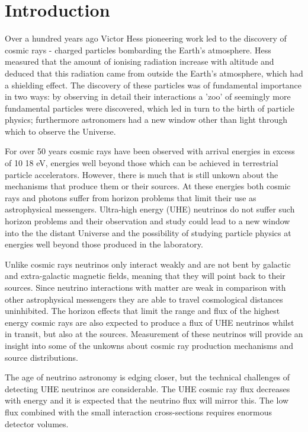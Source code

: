 \chapter{Introduction}
\label{chap:introduction}

Over a hundred years ago Victor Hess pioneering work led to the discovery of cosmic rays - charged particles bombarding the Earth's atmosphere. Hess measured that the amount of ionising radiation increase with altitude and deduced that this radiation came from outside the Earth's atmosphere, which had a shielding effect. The discovery of these particles was of fundamental importance in two ways: by observing in detail their interactions a 'zoo' of seemingly more fundamental particles were discovered, which led in turn to the birth of particle physics; furthermore astronomers had a new window other than light through which to observe the Universe.

For over 50 years cosmic rays have been observed with arrival energies in excess of 10 18 eV, energies well beyond those which can be achieved in terrestrial particle accelerators. However, there is much that is still unkown about the mechanisms that produce them or their sources. At these energies both cosmic rays and photons suffer from horizon problems that limit their use as astrophysical messengers. Ultra-high energy (UHE) neutrinos do not suffer such horizon problems and their observation and study could lead to a new window into the the distant Universe and the possibility of studying particle physics at energies well beyond those produced in the laboratory. 

Unlike cosmic rays neutrinos only interact weakly and are not bent by galactic and extra-galactic magnetic fields, meaning that they will point back to their sources. Since neutrino interactions with matter are weak in comparison with other astrophysical messengers they are able to travel cosmological distances uninhibited. The horizon effects that limit the range and flux of the highest energy cosmic rays are also expected to produce a flux of UHE neutrinos whilst in transit, but also at the sources. Measurement of these neutrinos will provide an insight into some of the unkowns about cosmic ray production mechanisms and source distributions.

The age of neutrino astronomy is edging closer, but the technical challenges of detecting UHE neutrinos are considerable. The UHE cosmic ray flux decreases with energy and it is expected that the neutrino flux will mirror this. The low flux combined with the small interaction cross-sections requires enormous detector volumes.

